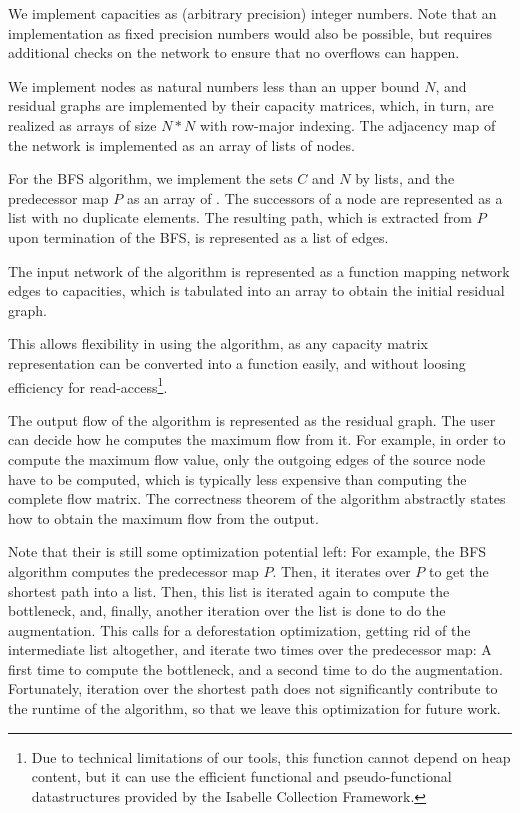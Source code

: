 \documentclass{llncs}
\begin{document}
  We implement capacities as (arbitrary precision) integer numbers. Note that an implementation as fixed precision numbers would also be possible,
  but requires additional checks on the network to ensure that no overflows can happen. 
  
  We implement nodes as natural numbers less than an upper bound $N$, and residual graphs are implemented by their capacity matrices, which, in turn,
  are realized as arrays of size $N*N$ with row-major indexing.
  The adjacency map of the network is implemented as an array of lists of nodes. 
  
  For the BFS algorithm, we implement the sets $C$ and $N$ by lists, and the predecessor map $P$ as an array of . 
  The successors of a node are represented as a list with no duplicate elements. The resulting path, which is extracted from $P$ upon termination of
  the BFS, is represented as a list of edges. 
  
  The input network of the algorithm is represented as a function mapping network edges to capacities, which is tabulated into an array
  to obtain the initial residual graph.
  
  This allows flexibility in using the algorithm, as any capacity matrix representation can be converted into a function easily, and 
  without loosing efficiency for read-access\footnote{Due to technical limitations of our tools, this function 
  cannot depend on heap content, but it can use the efficient functional and pseudo-functional datastructures provided by the Isabelle Collection Framework.}. 
      
  The output flow of the algorithm is represented as the residual graph. The user can decide how he computes the maximum flow from it. For example,
  in order to compute the maximum flow value, only the outgoing edges of the source node have to be computed, which is typically less 
  expensive than computing the complete flow matrix. The correctness theorem of the algorithm abstractly states how to obtain the maximum flow from the output.

  Note that their is still some optimization potential left: For example, the BFS algorithm computes the predecessor map $P$.
  Then, it iterates over $P$ to get the shortest path into a list. Then, this list is iterated again to compute the 
  bottleneck, and, finally, another iteration over the list is done to do the augmentation. This calls for a deforestation optimization,
  getting rid of the intermediate list altogether, and iterate two times over the predecessor map: A first time to compute the bottleneck, and a second time
  to do the augmentation. Fortunately, iteration over the shortest path does not significantly contribute to the runtime of the algorithm, so that we leave this
  optimization for future work.
  
\end{document}
